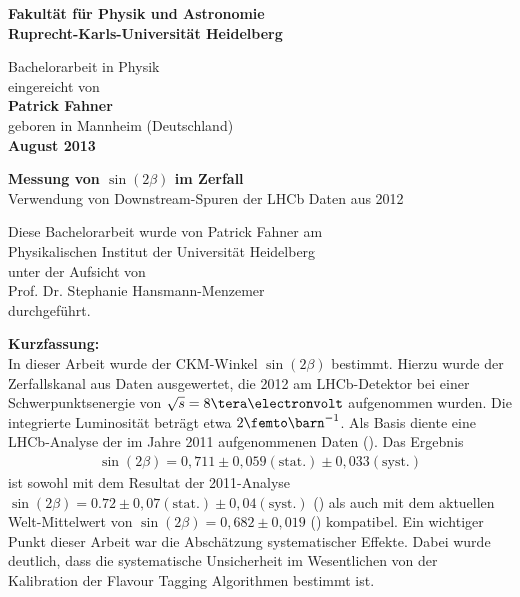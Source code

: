 \begin{titlepage}
\begin{center}
 
\Large\textbf{Fakultät für Physik und Astronomie\\
Ruprecht-Karls-Universität Heidelberg}

\vspace{15cm}

\normalsize
Bachelorarbeit in Physik\\
eingereicht von\\
\vspace{0.5cm}
\Large\textbf{Patrick Fahner}\\
\normalsize
\vspace{0.5cm}
geboren in Mannheim (Deutschland)\\
\vspace{0.5cm}
\Large\textbf{August 2013}

\newpage
\newpage

\normalsize
\Huge{\textbf{Messung von $\sin(2\beta)$ im Zerfall \Decaychannel}} \\
\LARGE{Verwendung von \glqq Downstream\grqq -Spuren der LHCb Daten aus 2012}

\vfill
\normalsize
Diese Bachelorarbeit wurde von Patrick Fahner am\\
Physikalischen Institut der Universität Heidelberg\\
unter der Aufsicht von\\
Prof. Dr. Stephanie Hansmann-Menzemer \\
durchgeführt.
\end{center}

\newpage
\Large\textbf{Kurzfassung:} \\
\normalsize
In dieser Arbeit wurde der CKM-Winkel $\sin(2\beta)$ bestimmt. Hierzu wurde der Zerfallskanal \Decaychannel aus Daten ausgewertet, die 2012 am LHCb-Detektor bei einer Schwerpunktsenergie von $\sqrt{s}=8\tera\electronvolt$ aufgenommen wurden. Die integrierte Luminosität beträgt etwa $2\femto\barn^{-1}$. Als Basis diente eine LHCb-Analyse der im Jahre 2011 aufgenommenen Daten (\cite{lhcb-paper}). Das Ergebnis 
\begin{align*}
\sin(2\beta) = 0,711 \pm 0,059(\text{stat.}) \pm 0,033(\text{syst.})
\end{align*}
ist sowohl mit dem Resultat der 2011-Analyse $\sin(2\beta) = 0.72 \pm 0,07 (\text{stat.}) \pm 0,04 (\text{syst.})$ (\cite{lhcb-paper}) als auch mit dem aktuellen Welt-Mittelwert von $\sin(2\beta) = 0,682 \pm 0,019$ (\cite{pdg-average}) kompatibel. Ein wichtiger Punkt dieser Arbeit war die Abschätzung systematischer Effekte. Dabei wurde deutlich, dass die systematische Unsicherheit im Wesentlichen von der Kalibration der Flavour Tagging Algorithmen bestimmt ist.


\end{titlepage}
